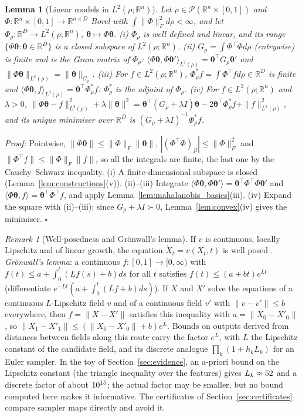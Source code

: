 \documentclass{article}
\newcommand{\RR}{\mathbb{R}}
\newcommand{\bth}{\boldsymbol{\theta}}
\theoremstyle{plain}
\newtheorem{lemma}[theorem]{Lemma}
\theoremstyle{remark}
\newtheorem{remark}[theorem]{Remark}
\begin{document}
\begin{lemma}[Linear models in $L^2(\rho;\RR^n)$]\label{lem:linear_models}
Let $\rho\in\mathcal P(\RR^n\times[0,1])$ and $\Phi:\RR^n\times[0,1]\to\RR^{n\times D}$ Borel with $\int\|\Phi\|_F^2d\rho<\infty$, and let
$\Phi_\rho:\RR^D\to L^2(\rho;\RR^n)$, $\bth\mapsto\Phi\bth$.
(i) $\Phi_\rho$ is well defined and linear, and its range $\{\Phi\bth:\bth\in\RR^D\}$ is a closed subspace of $L^2(\rho;\RR^n)$.
(ii) $G_\rho=\int\Phi^\top\Phi d\rho$ (entrywise) is finite and is the Gram matrix of $\Phi_\rho$: $\langle\Phi\bth,\Phi\bth'\rangle_{L^2(\rho)}=\bth^\top G_\rho\bth'$ and
$\|\Phi\bth\|_{L^2(\rho)}=\|\bth\|_{G_\rho}$.
(iii) For $f\in L^2(\rho;\RR^n)$, $\Phi_\rho^*f=\int\Phi^\top fd\rho\in\RR^D$ is finite and $\langle\Phi\bth,f\rangle_{L^2(\rho)}=\bth^\top\Phi_\rho^*f$: $\Phi^*_\rho$ is the
adjoint of $\Phi_\rho$.
(iv) For $f\in L^2(\rho;\RR^n)$ and $\lambda>0$,
$\|\Phi\bth-f\|^2_{L^2(\rho)}+\lambda\|\bth\|^2=\bth^\top(G_\rho+\lambda I)\bth-2\bth^\top\Phi^*_\rho f+\|f\|^2_{L^2(\rho)}$, and its unique minimiser over $\RR^D$ is
$(G_\rho+\lambda I)^{-1}\Phi^*_\rho f$.
\end{lemma}
\textit{Proof:}
Pointwise, $\|\Phi\bth\|\le\|\Phi\|_F\|\bth\|$, $|(\Phi^\top\Phi)_{jl}|\le\|\Phi\|_F^2$ and $\|\Phi^\top f\|\le\|\Phi\|_F\|f\|$, so all the integrals are finite, the last
one by the Cauchy--Schwarz inequality. (i) A finite-dimensional subspace is closed (Lemma~\ref{lem:constructions}(v)). (ii)--(iii)
Integrate $\langle\Phi\bth,\Phi\bth'\rangle=\bth^\top\Phi^\top\Phi\bth'$ and $\langle\Phi\bth,f\rangle=\bth^\top\Phi^\top f$, and apply
Lemma~\ref{lem:mahalanobis_basics}(iii). (iv) Expand the square with (ii)--(iii); since $G_\rho+\lambda I\succ0$, Lemma~\ref{lem:convex}(iv) gives the
minimiser. \hfill$\square$

\begin{remark}[Well-posedness and Gr\"onwall's lemma]\label{rem:gronwall}
If $v$ is continuous, locally Lipschitz and of linear growth, the equation $\dot X_t=v(X_t,t)$ is well posed
\citep[Ch.~2]{teschl2012ordinary}. \emph{Gr\"onwall's lemma}: a continuous $f:[0,1]\to[0,\infty)$ with $f(t)\le a+\int_0^t(Lf(s)+b)ds$ for all $t$
satisfies $f(t)\le(a+bt)e^{Lt}$ (differentiate $e^{-Lt}(a+\int_0^t(Lf+b)ds)$). If $X$ and $X'$ solve the equations of a continuous $L$-Lipschitz field $v$
and of a continuous field $v'$ with $\|v-v'\|\le b$ everywhere, then $f=\|X-X'\|$ satisfies this inequality with $a=\|X_0-X'_0\|$, so
$\|X_1-X'_1\|\le(\|X_0-X'_0\|+b)e^L$. Bounds on outputs derived from distances between fields along this route carry the factor $e^L$,
with $L$ the Lipschitz constant of the candidate field, and its discrete analogue $\prod_k(1+h_kL_k)$ for an Euler sampler. In the toy of
Section~\ref{sec:evidence}, an a-priori bound on the Lipschitz constant (the triangle inequality over the features) gives
$L_k\approx52$ and a discrete factor of about $10^{15}$; the actual factor may be smaller, but no bound computed
here makes it informative. The certificates of Section~\ref{sec:certificates} compare sampler maps directly and avoid it.
\end{remark}
\end{document}
